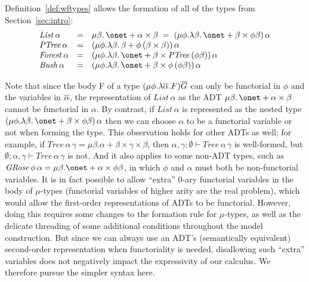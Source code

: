 \documentclass{lmcs}
\theoremstyle{plain}\newtheorem{satz}[thm]{Satz}
\begin{document}
Definition~\ref{def:wftypes} allows the formation of all of the types
from Section~\ref{sec:intro}:
\[\begin{array}{lll}
\mathit{List}\, \alpha & = & \mu \beta. \,\onet + \alpha \times
\beta\; = \; (\mu \phi. \lambda \beta.\,\onet + \beta \times \phi
\beta)\,\alpha\\ 
\mathit{PTree}\,\alpha & = & (\mu \phi. \lambda \beta.\,\beta +
\phi\,(\beta \times \beta))\,\alpha\\
\mathit{Forest}\,\alpha & = & (\mu \phi. \lambda \beta. \,\onet +
\beta \times \mathit{PTree}\,(\phi \beta))\,\alpha\\ 
\mathit{Bush}\,\alpha & = & (\mu \phi.\lambda \beta. \,\onet + \beta
\times \phi\,(\phi\beta))\,\alpha 
\end{array}\]
           
Note that since the body F of a type $(\mu \phi. \lambda
\overline{\alpha}. F)\overline{G}$ can only be functorial in $\phi$ and the
variables in $\overline{\alpha}$, the representation of
$\mathit{List}\,\alpha$ as the ADT $\mu \beta. \,\onet + \alpha \times
\beta$ cannot be functorial in $\alpha$. By contrast, if
$\mathit{List}\,\alpha$ is represented as the nested type $(\mu
\phi. \lambda \beta.\,\onet + \beta \times \phi \beta)\,\alpha$ then
we can choose $\alpha$ to be a functorial variable or not when forming
the type. This observation holds for other ADTs as well; for example,
if $\mathit{Tree}\,\alpha\,\gamma = \mu \beta. \alpha + \beta \times
\gamma \times \beta$, then $\alpha, \gamma; \emptyset \vdash
\mathit{Tree}\,\alpha\,\gamma$ is well-formed, but $\emptyset; \alpha,
\gamma \vdash \mathit{Tree}\,\alpha\,\gamma$ is not. And it also
applies to some non-ADT types, such as $\mathit{GRose}\,\phi\,\alpha =
\mu \beta. \onet + \alpha \times \phi\beta$, in which $\phi$ and
$\alpha$ must both be non-functorial variables.  It is in fact
possible to allow ``extra'' $0$-ary functorial variables in the body
of $\mu$-types (functorial variables of higher arity are the real
problem), which would allow the first-order representations of ADTs to
be functorial. However, doing this requires some changes to the
formation rule for $\mu$-types, as well as the delicate threading of
some additional conditions throughout the model construction.  But
since we can always use an ADT's (semantically equivalent)
second-order representation when functoriality is needed, disallowing
such ``extra'' variables does not negatively impact the expressivity
of our calculus. We therefore pursue the simpler syntax here.
\end{document}
